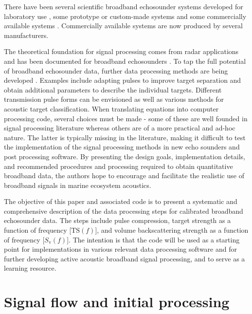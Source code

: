 \documentclass[preprint,12pt,TurnOnLineNumbers]{JASAnew}
\newcommand{\freqsym}{f}
\newcommand{\ts}{\textrm{TS}}
\newcommand{\sv}{S_{\textrm{v}}}
\begin{document}
There have been several scientific broadband echosounder systems developed for laboratory use \citep{Conti2003Wide-bandwidth, Forland2014Scattering, chu1992}, some prototype or custom-made systems \citep{Zakharia1989Wide-band, Zakharia1996Wideband, Simmonds1996Species, Foote2005Measuring, Imaizumi2009Detection, Briseno-Avena2015ZOOPS, Barr2002Target} and some commercially available systems \citep{Gordon1998FishMASS, Zedel2003Acoustic, Stanton2010New, ehrenbergFMSlideChirp2000, dennyBroadbandAcousticFish1998}. Commercially available systems are now produced by several manufacturers.

The theoretical foundation for signal processing comes from radar applications and has been documented for broadband echosounders \citep{stanton2008}. To tap the full potential of broadband echosounder data, further data processing methods are being developed \citep{lavery2017,bassett_broadband_2018}. Examples include adapting pulses to improve target separation and obtain additional parameters to describe the individual targets. Different transmission pulse forms can be envisioned as well as various methods for acoustic target classification. When translating equations into computer processing code, several choices must be made - some of these are well founded in signal processing literature whereas others are of a more practical and ad-hoc nature. The latter is typically missing in the literature, making it difficult to test the implementation of the signal processing methods in new echo sounders and post processing software. By presenting the design goals, implementation details, and recommended procedures and processing required to obtain quantitative broadband data, the authors hope to encourage and facilitate the realistic use of broadband signals in marine ecosystem acoustics.

The objective of this paper and associated code is to present a systematic and comprehensive description of the data processing steps for calibrated broadband echosounder data. The steps include pulse compression, target strength as a function of frequency [$\ts(\freqsym)$], and volume backscattering strength as a function of frequency [$\sv(\freqsym)$]. The intention is that the code will be used as a starting point for implementations in various relevant data processing software and for further developing active acoustic broadband signal processing, and to serve as a learning resource.  

\section{Signal flow and initial processing}
\end{document}
